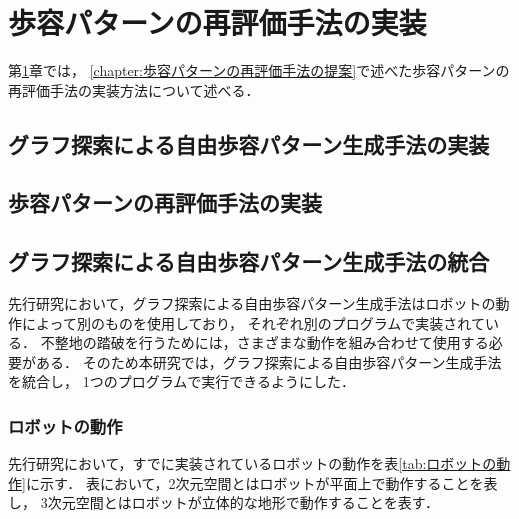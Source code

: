 ﻿%

\chapter{歩容パターンの再評価手法の実装}\label{chapter:歩容パターンの再評価手法の実装}
第\ref{chapter:歩容パターンの再評価手法の実装}章では，
\ref{chapter:歩容パターンの再評価手法の提案}で述べた歩容パターンの再評価手法の実装方法について述べる．

\section{グラフ探索による自由歩容パターン生成手法の実装}
\section{歩容パターンの再評価手法の実装}
\section{グラフ探索による自由歩容パターン生成手法の統合}
先行研究において，グラフ探索による自由歩容パターン生成手法はロボットの動作によって別のものを使用しており，
それぞれ別のプログラムで実装されている．
不整地の踏破を行うためには，さまざまな動作を組み合わせて使用する必要がある．
そのため本研究では，グラフ探索による自由歩容パターン生成手法を統合し，
1つのプログラムで実行できるようにした．

\subsection{ロボットの動作}
先行研究において，すでに実装されているロボットの動作を表\ref{tab:ロボットの動作}に示す．
表において，2次元空間とはロボットが平面上で動作することを表し，
3次元空間とはロボットが立体的な地形で動作することを表す．

